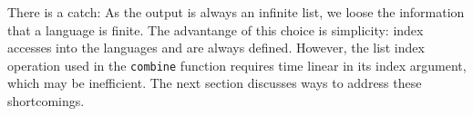 There is a catch: As the output is always an infinite list, we loose the
information that a language is finite. The advantange of this choice is simplicity: index
accesses into the languages  and  are always defined. 
However, the list index operation used in the \lstinline{combine} function requires time
linear in its index argument, which may be inefficient.  
The next section discusses ways to address these shortcomings.

